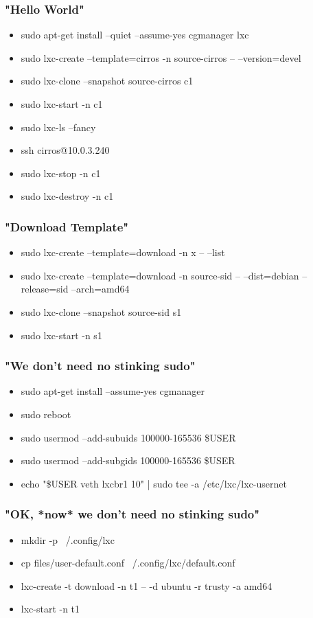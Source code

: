 \documentclass{beamer}
\begin{document}
\begin{frame}
   \frametitle{"Hello World"}
   \begin{itemize}
      \item sudo apt-get install --quiet --assume-yes cgmanager lxc
      \item sudo lxc-create --template=cirros -n source-cirros  -- --version=devel
      \item sudo lxc-clone --snapshot source-cirros c1
      \item sudo lxc-start -n c1
      \item sudo lxc-ls --fancy
      \item ssh cirros@10.0.3.240
      \item sudo lxc-stop -n c1
      \item sudo lxc-destroy -n c1
   \end{itemize}
\end{frame}

\begin{frame}
   \frametitle{"Download Template"}
   \begin{itemize}
      \item sudo lxc-create --template=download -n x -- --list
      \item sudo lxc-create --template=download -n source-sid -- --dist=debian --release=sid --arch=amd64
      \item sudo lxc-clone --snapshot source-sid s1
      \item sudo lxc-start -n s1
   \end{itemize}
\end{frame}

\begin{frame}
   \frametitle{"We don't need no stinking sudo"}
   \begin{itemize}
      \item sudo apt-get install --assume-yes cgmanager
      \item sudo reboot
      \item sudo usermod --add-subuids 100000-165536 \$USER
      \item sudo usermod --add-subgids 100000-165536 \$USER
      \item echo "\$USER veth lxcbr1 10" | sudo tee -a /etc/lxc/lxc-usernet
   \end{itemize}
\end{frame}

\begin{frame}
   \frametitle{"OK, *now* we don't need no stinking sudo"}
   \begin{itemize}
      \item mkdir -p ~/.config/lxc
      \item cp files/user-default.conf ~/.config/lxc/default.conf
      \item lxc-create -t download -n t1 -- -d ubuntu -r trusty -a amd64
      \item lxc-start -n t1
   \end{itemize}
\end{frame}
\end{document}

